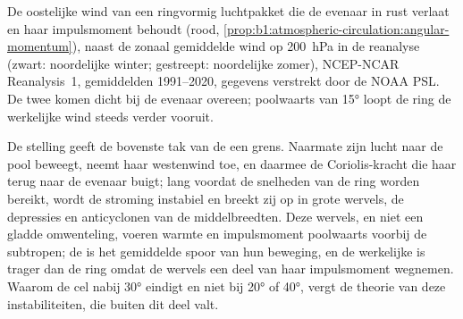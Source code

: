 \begin{omfigure}

{\small De oostelijke wind van een ringvormig luchtpakket die de evenaar in rust verlaat en haar impulsmoment behoudt (rood, \cref{prop:b1:atmospheric-circulation:angular-momentum}), naast de zonaal gemiddelde wind op \qty{200}{hPa} in de reanalyse (zwart: noordelijke winter; gestreept: noordelijke zomer), NCEP-NCAR Reanalysis~1, gemiddelden 1991--2020, gegevens verstrekt door de NOAA PSL. De twee komen dicht bij de evenaar overeen; poolwaarts van \ang{15} loopt de ring de werkelijke wind steeds verder vooruit.}
\label{fig:b1:atmospheric-circulation:angular-momentum}
\end{omfigure}

De stelling geeft de bovenste tak van de  een grens. Naarmate zijn lucht naar de pool beweegt, neemt haar westenwind toe, en daarmee de Coriolis-kracht die haar terug naar de evenaar buigt; lang voordat de snelheden van de ring worden bereikt, wordt de stroming instabiel en breekt zij op in grote wervels, de depressies en anticyclonen van de middelbreedten. Deze wervels, en niet een gladde omwenteling, voeren warmte en impulsmoment poolwaarts voorbij de subtropen; de  is het gemiddelde spoor van hun beweging, en de werkelijke  is trager dan de ring omdat de wervels een deel van haar impulsmoment wegnemen. Waarom de cel nabij \ang{30} eindigt en niet bij \ang{20} of \ang{40}, vergt de theorie van deze instabiliteiten, die buiten dit deel valt.

